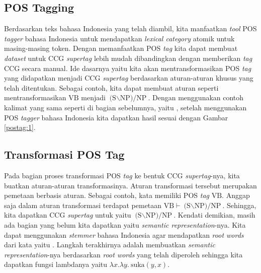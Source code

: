 \subsection{POS Tagging}

Berdasarkan teks bahasa Indonesia yang telah diambil, kita manfaatkan \textit{tool} POS \textit{tagger}
bahasa Indonesia untuk mendapatkan \textit{lexical category} atomik untuk masing-masing token.
Dengan memanfaatkan POS \textit{tag} kita dapat membuat \textit{dataset} untuk CCG \textit{supertag}
lebih mudah dibandingkan dengan memberikan \textit{tag} CCG secara manual.
Ide dasarnya yaitu kita akan mentransformasikan POS \textit{tag} yang didapatkan menjadi CCG
\textit{supertag} berdasarkan aturan-aturan khusus yang telah ditentukan.
Sebagai contoh, kita dapat membuat aturan seperti mentransformasikan $\text{VB}$ menjadi
$\text{(S$\backslash$NP)/NP}$.
Dengan menggunakan contoh kalimat yang sama seperti di bagian sebelumnya,
yaitu , setelah menggunakan POS \textit{tagger} bahasa
Indonesia kita dapatkan hasil sesuai dengan Gambar \ref{postag:1}.


\subsection{Transformasi POS Tag}

Pada bagian proses transformasi POS \textit{tag} ke bentuk CCG \textit{supertag}-nya,
kita buatkan aturan-aturan transformasinya.
Aturan transformasi tersebut merupakan pemetaan berbasis aturan.
Sebagai contoh, kata  memiliki POS \textit{tag} $\text{VB}$.
Anggap saja dalam aturan transformasi terdapat pemetaan $\text{VB} \vdash \text{(S$\backslash$NP)/NP}$.
Sehingga, kita dapatkan CCG \textit{supertag} untuk  yaitu $\text{(S$\backslash$NP)/NP}$.
Kendati demikian, masih ada bagian yang belum kita dapatkan yaitu \textit{semantic representation}-nya.
Kita dapat menggunakan \textit{stemmer} bahasa Indonesia agar mendapatkan \textit{root words}
dari kata  yaitu .
Langkah terakhirnya adalah membuatkan \textit{semantic representation}-nya berdasarkan
\textit{root words} yang telah diperoleh sehingga kita dapatkan fungsi lambdanya yaitu
$\lambda x.\lambda y.\ \text{suka}(y, x)$.

